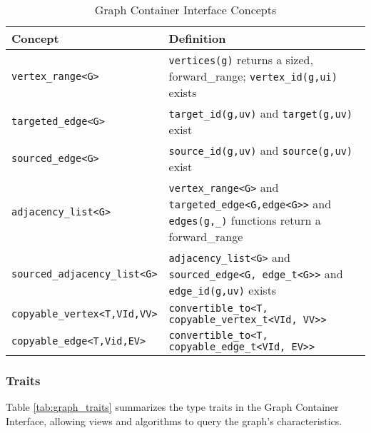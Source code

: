 \documentclass[10pt,onecolumn]{article}
\newcommand{\tcode}[1]{\lstinline[breaklines=true]{#1}}
\begin{document}
\begin{table}[h!]
\begin{center}
{\begin{tabular}{l L{12.0cm}}
\hline
    \textbf{Concept} & \textbf{Definition} \\
\hline
    \tcode{vertex_range<G>} & \tcode{vertices(g)} returns a sized, forward\_range; \tcode{vertex_id(g,ui)} exists\\
    \tcode{targeted_edge<G>} & \tcode{target_id(g,uv)} and \tcode{target(g,uv)} exist\\
    \tcode{sourced_edge<G>} & \tcode{source_id(g,uv)} and \tcode{source(g,uv)} exist\\
    \tcode{adjacency_list<G>} & \tcode{vertex_range<G>} and \tcode{targeted_edge<G,edge<G>>} and \tcode{edges(g,_)} functions return a forward\_range\\
    \tcode{sourced_adjacency_list<G>} & \tcode{adjacency_list<G>} and \tcode{sourced_edge<G, edge_t<G>>} and     \tcode{edge_id(g,uv)} exists \\
\hline
    \tcode{copyable_vertex<T,VId,VV>} & \tcode{convertible_to<T, copyable_vertex_t<VId, VV>>} \\
    \tcode{copyable_edge<T,Vid,EV>} & \tcode{convertible_to<T, copyable_edge_t<VId, EV>>} \\
\hline
\end{tabular}}
\caption{Graph Container Interface Concepts}
\label{tab:graph_concepts}
\end{center}
\end{table}

\subsubsection{Traits}
Table \ref{tab:graph_traits} summarizes the type traits in the Graph Container Interface, allowing views and algorithms to query the graph's characteristics.
\end{document}
